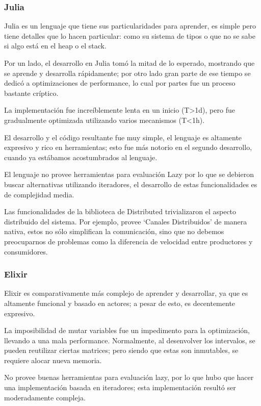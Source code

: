 \documentclass[11pt]{article}
\let\Oldsubsubsection\subsubsection
\renewcommand{\subsubsection}{\FloatBarrier\Oldsubsubsection}
\begin{document}
\subsubsection{Julia}

Julia es un lenguaje que tiene sus particularidades para aprender, es simple pero tiene detalles que lo hacen particular: como su sistema de tipos o que no se sabe si algo está en el heap o el stack.

Por un lado, el desarrollo en Julia tomó la mitad de lo esperado, mostrando que se aprende y desarrolla rápidamente; por otro lado gran parte de ese tiempo se dedicó a optimizaciones de performance, lo cual por partes fue un proceso bastante críptico.

La implementación fue increíblemente lenta en un inicio (T>1d), pero fue gradualmente optimizada utilizando varios mecanismos (T<1h).

El desarrollo y el código resultante fue muy simple, el lenguaje es altamente expresivo y rico en herramientas; esto fue más notorio en el segundo desarrollo, cuando ya estábamos acostumbrados al lenguaje.

El lenguaje no provee herramientas para evaluación Lazy por lo que se debieron buscar alternativas utilizando iteradores, el desarrollo de estas funcionalidades es de complejidad media.

Las funcionalidades de la biblioteca de Distributed trivializaron el aspecto distribuido del sistema. Por ejemplo, provee ‘Canales Distribuidos’ de manera nativa, estos no sólo simplifican la comunicación, sino que no debemos preocuparnos de problemas como la diferencia de velocidad entre productores y consumidores.

\subsubsection{Elixir}

Elixir es comparativamente más complejo de aprender y desarrollar, ya que es altamente funcional y basado en actores; a pesar de esto, es decentemente expresivo.

La imposibilidad de mutar variables fue un impedimento para la optimización, llevando a una mala performance. Normalmente, al desenvolver los intervalos, se pueden reutilizar ciertas matrices; pero siendo que estas son inmutables, se requiere alocar nueva memoria.

No provee buenas herramientas para evaluación lazy, por lo que hubo que hacer una implementación basada en iteradores; esta implementación resultó ser moderadamente compleja.
\end{document}
